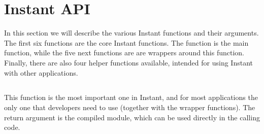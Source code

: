 
\section{Instant API}

\label{wilbers:sec:api}
In this section we will describe the various Instant functions and
their arguments. The first six functions are the core Instant
functions. The function  is the main function,
while the five next functions are are wrappers around this
function. Finally, there are also four helper functions available,
intended for using Instant with other applications.

\subsection[build\_module]{}

This function is the most important one in Instant, and for most applications
the only one that developers need to use (together with the wrapper functions).
The return argument is the compiled module, which
can be used directly in the calling code.


